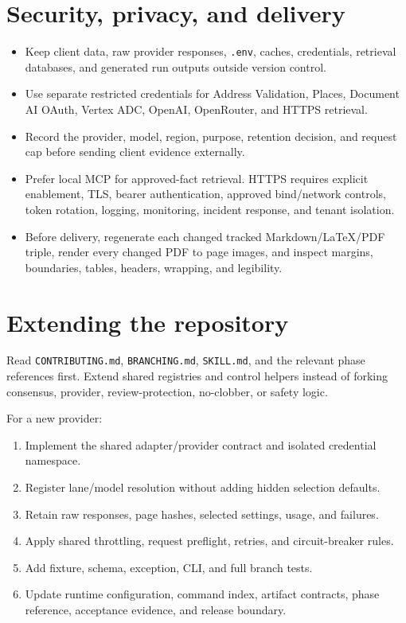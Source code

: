 \documentclass[
]{article}
\providecommand{\tightlist}{%
  \setlength{\itemsep}{0pt}\setlength{\parskip}{0pt}}
\begin{document}
\section{Security, privacy, and
delivery}\label{security-privacy-and-delivery}

\begin{itemize}
\tightlist
\item
  Keep client data, raw provider responses, \texttt{.env}, caches,
  credentials, retrieval databases, and generated run outputs outside
  version control.
\item
  Use separate restricted credentials for Address Validation, Places,
  Document AI OAuth, Vertex ADC, OpenAI, OpenRouter, and HTTPS
  retrieval.
\item
  Record the provider, model, region, purpose, retention decision, and
  request cap before sending client evidence externally.
\item
  Prefer local MCP for approved-fact retrieval. HTTPS requires explicit
  enablement, TLS, bearer authentication, approved bind/network
  controls, token rotation, logging, monitoring, incident response, and
  tenant isolation.
\item
  Before delivery, regenerate each changed tracked Markdown/LaTeX/PDF
  triple, render every changed PDF to page images, and inspect margins,
  boundaries, tables, headers, wrapping, and legibility.
\end{itemize}

\section{Extending the repository}\label{extending-the-repository}

Read \texttt{CONTRIBUTING.md}, \texttt{BRANCHING.md}, \texttt{SKILL.md},
and the relevant phase references first. Extend shared registries and
control helpers instead of forking consensus, provider,
review-protection, no-clobber, or safety logic.

For a new provider:

\begin{enumerate}
\def\labelenumi{\arabic{enumi}.}
\tightlist
\item
  Implement the shared adapter/provider contract and isolated credential
  namespace.
\item
  Register lane/model resolution without adding hidden selection
  defaults.
\item
  Retain raw responses, page hashes, selected settings, usage, and
  failures.
\item
  Apply shared throttling, request preflight, retries, and
  circuit-breaker rules.
\item
  Add fixture, schema, exception, CLI, and full branch tests.
\item
  Update runtime configuration, command index, artifact contracts, phase
  reference, acceptance evidence, and release boundary.
\end{enumerate}
\end{document}
